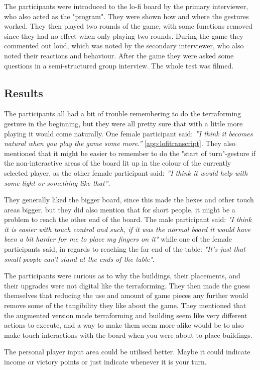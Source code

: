 The participants were introduced to the lo-fi board by the primary interviewer, who also acted as the "program". They were shown how and where the gestures worked. They then played two rounds of the game, with some functions removed since they had no effect when only playing two rounds. During the game they commented out loud, which was noted by the secondary interviewer, who also noted their reactions and behaviour. 
After the game they were asked some questions in a semi-structured group interview. 
The whole test was filmed.

\subsection{Results} 
The participants all had a bit of trouble remembering to do the terraforming gesture in the beginning, but they were all pretty sure that with a little more playing it would come naturally. One female participant said: \textit{”I think it becomes natural when you play the game some more.”} \ref{app:lofitranscript}. They also mentioned that it might be easier to remember to do the "start of turn"-gesture if the non-interactive areas of the board lit up in the colour of the currently selected player, as the other female participant said: \textit{”I think it would help with some light or something like that”}.

They generally liked the bigger board, since this made the hexes and other touch areas bigger, but they did also mention that for short people, it might be a problem to reach the other end of the board. The male participant said: \textit{"I think it is easier with touch control and such, if it was the normal board it would have been a bit harder for me to place my fingers on it"} while one of the female participants said, in regards to reaching the far end of the table: \textit{"It’s just that small people can't stand at the ends of the table"}.

The participants were curious as to why the buildings, their placements, and their upgrades were not digital like the terraforming. They then made the guess themselves that reducing the use and amount of game pieces any further would remove some of the tangibility they like about the game. They mentioned that the augmented version made terraforming and building seem like very different actions to execute, and a way to make them seem more alike would be to also make touch interactions with the board when you were about to place buildings.

The personal player input area could be utilised better. Maybe it could indicate income or victory points or just indicate whenever it is your turn. 

